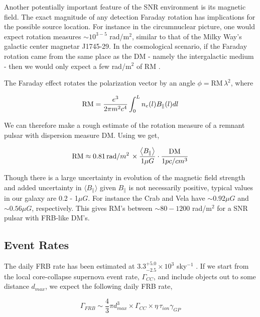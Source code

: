 \documentclass[useAMS,usenatbib]{mn2e}
\begin{document}
Another potentially important feature of the SNR environment is its magnetic
field. 
The exact magnitude of any detection Faraday rotation has implications for the possible source location. For
instance in the circumnuclear picture, one would expect rotation measures 
$\sim10^{3-5}$ rad/m$^2$, similar to that of the Milky Way's
galactic center magnetar J1745-29. In the cosmological scenario, if the Faraday 
rotation
came from the same place as the DM - namely the intergalactic medium -
then we would only expect a few rad/m$^2$ of RM \cite{2015A&A...575A.118O}. 

The Faraday effect rotates the polarization vector
by an angle $\phi = $RM$\, \lambda^2$, where

\begin{equation}
\textup{RM} = \frac{e^3}{2\pi m^2 c^4} \int_0^{L} n_e(l) B_\parallel (l) dl
\end{equation}

We can therefore make a rough estimate of the rotation measure of a remnant 
pulsar with dispersion measure DM. Using 
\cite{2014ira..book.....B} we get,

\begin{equation}
\textup{RM} \approx 0.81\,\textup{rad} / m^2 \, \times \frac{\left < B_{\parallel} \right >}
{1 \mu G} \cdot \frac{\textup{DM}}{1 pc/cm^3} 
\end{equation}

Though there is a large uncertainty in evolution of the magnetic field strength and added
uncertainty in $\langle B_{\parallel} \rangle$ given $B_{\parallel}$ is not necessarily positive, 
typical values in our galaxy are 0.2 - 1$\mu G$. For instance the Crab and Vela have 
$ \sim 0.92 \mu G$ and $\sim 0.56 \mu G$, respectively. 
This gives RM's between $\sim 80-1200$
rad/m$^2$ for a SNR pulsar with FRB-like DM's.

\subsection{Event Rates}

The daily FRB rate has been estimated at $3.3^{+5.0}_{-2.5}\times10^3$ sky$^{-1}$ 
\citep{2015arXiv150500834R}. If we start from the local core-collapse supernova
event rate, $\Gamma_{CC}$, and include objects out to some distance $d_{max}$,
we expect the following daily FRB rate, 

\begin{equation}
\Gamma_{FRB} \sim  \frac{4}{3} \pi d_{max}^3 \times \Gamma_{CC} \times
 \eta \, \tau_{ion} \gamma_{GP}
\end{equation}
\end{document}
